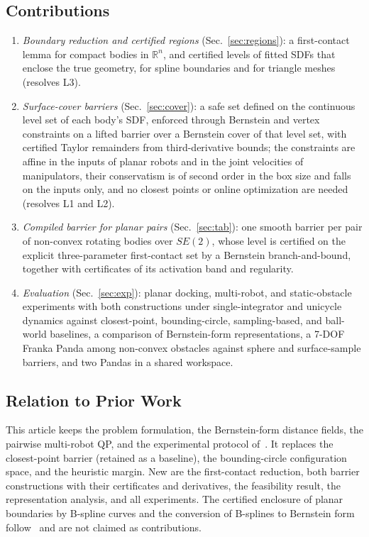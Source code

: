 \documentclass[journal]{IEEEtran}
\theoremstyle{definition}
\newcommand{\R}{\mathbb{R}}
\begin{document}
\subsection{Contributions}
\begin{enumerate}
\item \emph{Boundary reduction and certified regions} (Sec.~\ref{sec:regions}): a first-contact
lemma for compact bodies in $\R^n$, and certified levels of fitted SDFs that enclose the true
geometry, for spline boundaries and for triangle meshes (resolves L3).
\item \emph{Surface-cover barriers} (Sec.~\ref{sec:cover}): a safe set defined on the continuous level
set of each body's SDF, enforced through Bernstein and vertex constraints on a lifted barrier over a
Bernstein cover of that level set, with certified Taylor remainders from third-derivative bounds;
the constraints are affine in the inputs of planar robots and in the joint velocities of
manipulators, their conservatism is of second order in the box size and falls on the inputs only, and
no closest points or online optimization are needed (resolves L1 and L2).
\item \emph{Compiled barrier for planar pairs} (Sec.~\ref{sec:tab}): one smooth barrier per pair of
non-convex rotating bodies over $SE(2)$, whose level is certified on the explicit three-parameter
first-contact set by a Bernstein branch-and-bound, together with certificates of its activation
band and regularity.
\item \emph{Evaluation} (Sec.~\ref{sec:exp}): planar docking, multi-robot, and static-obstacle
experiments with both constructions under single-integrator and unicycle dynamics against
closest-point, bounding-circle, sampling-based, and ball-world baselines, a comparison of
Bernstein-form representations, a 7-DOF Franka Panda among non-convex obstacles against sphere and
surface-sample barriers, and two Pandas in a shared workspace.
\end{enumerate}

\subsection{Relation to Prior Work}\label{sec:relation}
This article keeps the problem formulation, the Bernstein-form distance fields, the pairwise
multi-robot QP, and the experimental protocol of~\cite{jo2026geometry}. It replaces the
closest-point barrier (retained as a baseline), the bounding-circle configuration space, and the
heuristic margin. New are the first-contact reduction, both barrier constructions with their
certificates and derivatives, the feasibility result, the representation analysis, and all
experiments. The certified enclosure of planar boundaries by B-spline curves and the conversion of
B-splines to Bernstein form follow~\cite{jo2027semantic} and are not claimed as contributions.
\end{document}
